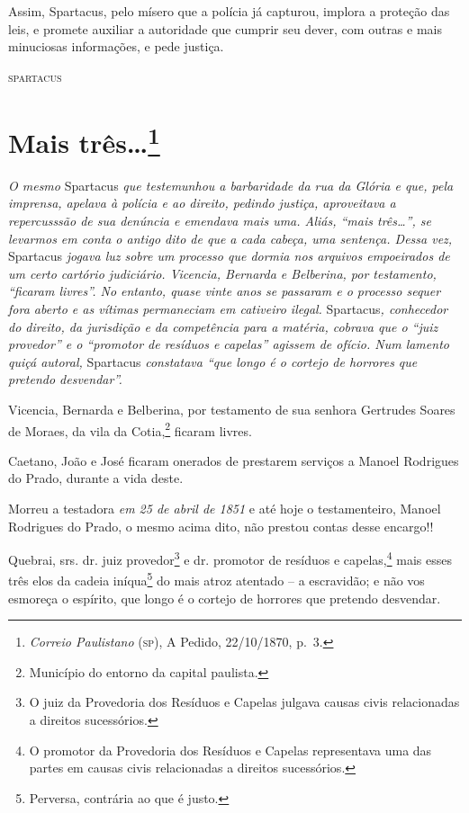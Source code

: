 Assim, Spartacus, pelo mísero que a polícia já capturou, implora a
proteção das leis, e promete auxiliar a autoridade que cumprir seu
dever, com outras e mais minuciosas informações, e pede justiça.

\begin{flushright}
\textsc{spartacus}
\end{flushright}

\chapter{Mais três\ldots{}\footnote{\emph{Correio Paulistano} (\textsc{sp}), A Pedido, 22/10/1870,
  p.~3.}} %

\begin{didascalia}
\emph{O mesmo} Spartacus \emph{que testemunhou a barbaridade da rua da
Glória e que, pela imprensa, apelava à polícia e ao direito, pedindo
justiça, aproveitava a repercusssão de sua denúncia e emendava mais uma.
Aliás, ``mais três\ldots{}'', se levarmos em conta o antigo dito de que a cada
cabeça, uma sentença. Dessa vez,} Spartacus \emph{jogava luz sobre um
processo que dormia nos arquivos empoeirados de um certo cartório
judiciário. Vicencia, Bernarda e Belberina, por testamento, ``ficaram
livres''. No entanto, quase vinte anos se passaram e o processo sequer
fora aberto e as vítimas permaneciam em cativeiro ilegal.}
Spartacus\emph{, conhecedor do direito, da jurisdição e da competência
para a matéria, cobrava que o ``juiz provedor'' e o ``promotor de resíduos
e capelas'' agissem de ofício. Num lamento quiçá autoral,} Spartacus
\emph{constatava ``que longo é o cortejo de horrores que pretendo
desvendar''.}
\end{didascalia}


Vicencia, Bernarda e Belberina, por testamento de sua senhora Gertrudes
Soares de Moraes, da vila da Cotia,\footnote{ Município do entorno da
  capital paulista.} ficaram livres.

Caetano, João e José ficaram onerados de prestarem serviços a Manoel
Rodrigues do Prado, durante a vida deste.

Morreu a testadora \emph{em 25 de abril de 1851} e até hoje o
testamenteiro, Manoel Rodrigues do Prado, o mesmo acima dito, não
prestou contas desse encargo!!

Quebrai, srs. dr. juiz provedor\footnote{ O juiz da Provedoria dos
  Resíduos e Capelas julgava causas civis relacionadas a direitos
  sucessórios.} e dr. promotor de resíduos e capelas,\footnote{ O
  promotor da Provedoria dos Resíduos e Capelas representava uma das
  partes em causas civis relacionadas a direitos sucessórios.} mais
esses três elos da cadeia iníqua\footnote{ Perversa, contrária ao que é
  justo.} do mais atroz atentado -- a escravidão; e não vos esmoreça o
espírito, que longo é o cortejo de horrores que pretendo desvendar.

